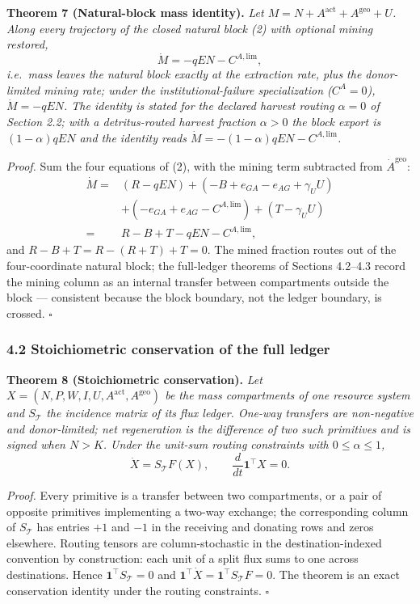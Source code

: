 \documentclass[11pt]{article}
\begin{document}
\textbf{Theorem 7 (Natural-block mass identity).} \emph{Let
\(M = N + A^{\mathrm{act}} + A^{\mathrm{geo}} + U\). Along every
trajectory of the closed natural block (2) with optional mining
restored,} \[\dot M = -qEN - C^{A,\mathrm{lim}},\] \emph{i.e.~mass
leaves the natural block exactly at the extraction rate, plus the
donor-limited mining rate; under the institutional-failure
specialization (\(C^A = 0\)), \(\dot M = -qEN\). The identity is stated
for the declared harvest routing \(\alpha = 0\) of Section 2.2; with a
detritus-routed harvest fraction \(\alpha > 0\) the block export is
\((1-\alpha)qEN\) and the identity reads
\(\dot M = -(1-\alpha)qEN - C^{A,\mathrm{lim}}\).}

\emph{Proof.} Sum the four equations of (2), with the mining term
subtracted from \(\dot A^{\mathrm{geo}}\):
\[\begin{aligned} \dot M = { }& (R - qEN) + (-B + e_{GA} - e_{AG} + \gamma_U U) \\
  { }& + (-e_{GA} + e_{AG} - C^{A,\mathrm{lim}}) + (T - \gamma_U U) \\[2pt]
  ={}& R - B + T - qEN - C^{A,\mathrm{lim}}, \end{aligned}\]
and \(R - B + T = R - (R + T) + T = 0\). The mined fraction routes out
of the four-coordinate natural block; the full-ledger theorems of
Sections 4.2--4.3 record the mining column as an internal transfer
between compartments outside the block --- consistent because the block
boundary, not the ledger boundary, is crossed. \ensuremath{\square}

\subsubsection{4.2 Stoichiometric conservation of the full
ledger}\label{stoichiometric-conservation-of-the-full-ledger}

\textbf{Theorem 8 (Stoichiometric conservation).} \emph{Let
\(X = (N, P, W, I, U, A^{\mathrm{act}}, A^{\mathrm{geo}})\) be the mass
compartments of one resource system and \(S_{\mathcal{T}}\) the
incidence matrix of its flux ledger. One-way transfers are non-negative
and donor-limited; net regeneration is the difference of two such
primitives and is signed when \(N > K\). Under the unit-sum routing
constraints with \(0 \le \alpha \le 1\),}
\[\dot X = S_{\mathcal{T}} F(X), \qquad \frac{d}{dt}\mathbf{1}^\top X = 0.\]

\emph{Proof.} Every primitive is a transfer between two compartments, or
a pair of opposite primitives implementing a two-way exchange; the
corresponding column of \(S_{\mathcal{T}}\) has entries \(+1\) and
\(-1\) in the receiving and donating rows and zeros elsewhere. Routing
tensors are column-stochastic in the destination-indexed convention by
construction: each unit of a split flux sums to one across destinations.
Hence \(\mathbf{1}^\top S_{\mathcal{T}} = 0\) and
\(\mathbf{1}^\top \dot X = \mathbf{1}^\top S_{\mathcal{T}} F = 0\). The
theorem is an exact conservation identity under the routing constraints.
\ensuremath{\square}
\end{document}
